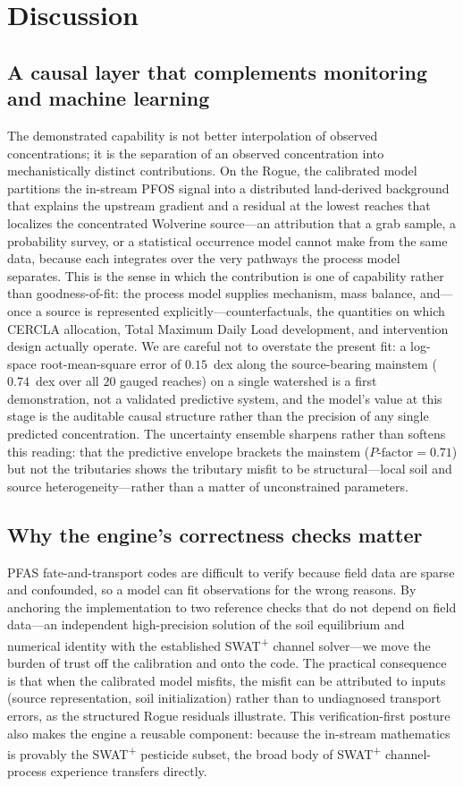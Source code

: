 \section{Discussion}\label{sec:discussion}

\subsection{A causal layer that complements monitoring and machine learning}
The demonstrated capability is not better interpolation of observed concentrations; it is the separation of an observed concentration into mechanistically distinct contributions. On the Rogue, the calibrated model partitions the in-stream PFOS signal into a distributed land-derived background that explains the upstream gradient and a residual at the lowest reaches that localizes the concentrated Wolverine source---an attribution that a grab sample, a probability survey, or a statistical occurrence model cannot make from the same data, because each integrates over the very pathways the process model separates. This is the sense in which the contribution is one of capability rather than goodness-of-fit: the process model supplies mechanism, mass balance, and---once a source is represented explicitly---counterfactuals, the quantities on which CERCLA allocation, Total Maximum Daily Load development, and intervention design actually operate. We are careful not to overstate the present fit: a log-space root-mean-square error of $0.15$~dex along the source-bearing mainstem ($0.74$~dex over all $20$ gauged reaches) on a single watershed is a first demonstration, not a validated predictive system, and the model's value at this stage is the auditable causal structure rather than the precision of any single predicted concentration. The uncertainty ensemble sharpens rather than softens this reading: that the predictive envelope brackets the mainstem ($P\text{-factor}=0.71$) but not the tributaries shows the tributary misfit to be structural---local soil and source heterogeneity---rather than a matter of unconstrained parameters.

\subsection{Why the engine's correctness checks matter}
PFAS fate-and-transport codes are difficult to verify because field data are sparse and confounded, so a model can fit observations for the wrong reasons. By anchoring the implementation to two reference checks that do not depend on field data---an independent high-precision solution of the soil equilibrium and numerical identity with the established SWAT\textsuperscript{+} channel solver---we move the burden of trust off the calibration and onto the code. The practical consequence is that when the calibrated model misfits, the misfit can be attributed to inputs (source representation, soil initialization) rather than to undiagnosed transport errors, as the structured Rogue residuals illustrate. This verification-first posture also makes the engine a reusable component: because the in-stream mathematics is provably the SWAT\textsuperscript{+} pesticide subset, the broad body of SWAT\textsuperscript{+} channel-process experience transfers directly.

